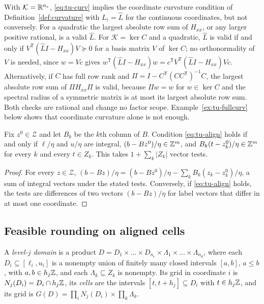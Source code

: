 \begin{remark}\label{rem:tu-curv}
With $\mathcal K=\mathbb R^{n_c}$, \eqref{eq:tu-curv} implies the coordinate
curvature condition of Definition~\ref{def:curvature} with $L_i=\hat L$ for the
continuous coordinates, but not conversely. For a quadratic the largest
absolute row sum of $H_{xx}$, or any larger positive rational, is a valid
$\hat L$. For $\mathcal K=\ker C$ and a quadratic, $\hat L$ is valid if and
only if $V^{\mathsf T}(\hat LI-H_{xx})V\succeq0$ for a basis matrix $V$ of $\ker C$;
no orthonormality of $V$ is needed, since $w=Vc$ gives
$w^{\mathsf T}(\hat LI-H_{xx})w=c^{\mathsf T}V^{\mathsf T}(\hat LI-H_{xx})Vc$.
Alternatively, if $C$ has full row rank and
$\Pi=I-C^{\mathsf T}(CC^{\mathsf T})^{-1}C$, the largest absolute row sum of
$\Pi H_{xx}\Pi$ is valid, because $\Pi w=w$ for $w\in\ker C$ and the spectral
radius of a symmetric matrix is at most its largest absolute row sum. Both
checks are rational and change no factor scope. Example~\ref{ex:tu-fullcurv}
below shows that coordinate curvature alone is not enough.
\end{remark}

\begin{proposition}\label{prop:tu-align}
Fix $z^0\in\mathcal Z$ and let $B_k$ be the $k$th column of $B$. Condition
\eqref{eq:tu-align} holds if and only if $\ell/\eta$ and $u/\eta$ are integral,
$(b-Bz^0)/\eta\in\mathbb Z^m$, and $B_k(t-z^0_k)/\eta\in\mathbb Z^m$ for every $k$ and
every $t\in Z_k$. This takes $1+\sum_k\lvert Z_k\rvert$ vector tests.
\end{proposition}

\begin{proof}
For every $z\in\mathcal Z$,
$(b-Bz)/\eta=(b-Bz^0)/\eta-\sum_kB_k(z_k-z^0_k)/\eta$, a sum of integral
vectors under the stated tests. Conversely, if \eqref{eq:tu-align} holds, the
tests are differences of two vectors $(b-Bz)/\eta$ for label vectors that
differ in at most one coordinate.
\end{proof}

\subsection{Feasible rounding on aligned cells}\label{sec:tu-rounding}

\begin{definition}\label{def:tu-domain}
A \emph{level-$j$ domain} is a product
$D=D_1\times\dots\times D_{n_c}\times\Lambda_1\times\dots\times\Lambda_{n_d}$,
where each $D_i\subseteq[\ell_i,u_i]$ is a nonempty union of finitely many
closed intervals $[a,b]$, $a\le b$, with $a,b\in h_j\mathbb Z$, and each
$\Lambda_k\subseteq Z_k$ is nonempty. Its grid in coordinate $i$ is
$N_j(D_i)=D_i\cap h_j\mathbb Z$, its \emph{cells} are the intervals
$[t,t+h_j]\subseteq D_i$ with $t\in h_j\mathbb Z$, and its grid is
$G(D)=\prod_iN_j(D_i)\times\prod_k\Lambda_k$.
\end{definition}

